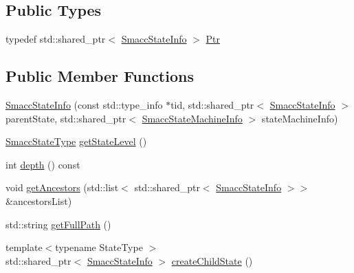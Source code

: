 \subsection*{Public Types}
\begin{DoxyCompactItemize}
\item 
typedef std\+::shared\+\_\+ptr$<$ \hyperlink{classsmacc_1_1introspection_1_1SmaccStateInfo}{Smacc\+State\+Info} $>$ \hyperlink{classsmacc_1_1introspection_1_1SmaccStateInfo_a374ef2022bca958ab14469931fc4dcc1}{Ptr}
\end{DoxyCompactItemize}
\subsection*{Public Member Functions}
\begin{DoxyCompactItemize}
\item 
\hyperlink{classsmacc_1_1introspection_1_1SmaccStateInfo_a262bc6242d8a3b2c29c34b4cf325dfb4}{Smacc\+State\+Info} (const std\+::type\+\_\+info $\ast$tid, std\+::shared\+\_\+ptr$<$ \hyperlink{classsmacc_1_1introspection_1_1SmaccStateInfo}{Smacc\+State\+Info} $>$ parent\+State, std\+::shared\+\_\+ptr$<$ \hyperlink{classsmacc_1_1introspection_1_1SmaccStateMachineInfo}{Smacc\+State\+Machine\+Info} $>$ state\+Machine\+Info)
\item 
\hyperlink{namespacesmacc_1_1introspection_a710cf406873961567c11027582c7f720}{Smacc\+State\+Type} \hyperlink{classsmacc_1_1introspection_1_1SmaccStateInfo_a360141a4883f0122a9f5e8b7de456084}{get\+State\+Level} ()
\item 
int \hyperlink{classsmacc_1_1introspection_1_1SmaccStateInfo_afbf3165f49cfd6cdb842120a6317a2cb}{depth} () const 
\item 
void \hyperlink{classsmacc_1_1introspection_1_1SmaccStateInfo_aca52fb4c1c3f5f35e3292bd7d6d6c66d}{get\+Ancestors} (std\+::list$<$ std\+::shared\+\_\+ptr$<$ \hyperlink{classsmacc_1_1introspection_1_1SmaccStateInfo}{Smacc\+State\+Info} $>$$>$ \&ancestors\+List)
\item 
std\+::string \hyperlink{classsmacc_1_1introspection_1_1SmaccStateInfo_a22e625806a74808ee272df5c034d122e}{get\+Full\+Path} ()
\item 
{\footnotesize template$<$typename State\+Type $>$ }\\std\+::shared\+\_\+ptr$<$ \hyperlink{classsmacc_1_1introspection_1_1SmaccStateInfo}{Smacc\+State\+Info} $>$ \hyperlink{classsmacc_1_1introspection_1_1SmaccStateInfo_a287664f0ac1c0380bad11ef6973cde8d}{create\+Child\+State} ()
\item 
$$
\end{DoxyCompactItemize}
